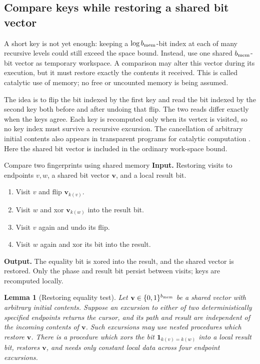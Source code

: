 \documentclass[11pt]{article}
\numberwithin{equation}{section}
\newtheorem{lemma}[theorem]{Lemma}
\theoremstyle{definition}
\theoremstyle{remark}
\begin{document}
\subsection{Compare keys while restoring a shared bit vector}

A short key is not yet enough: keeping a $\log {b_{\rm mem}}$-bit index at each of many recursive levels could still exceed the space bound. Instead, use one shared ${b_{\rm mem}}$-bit vector as temporary workspace. A comparison may alter this vector during its execution, but it must restore exactly the contents it received. This is called catalytic use of memory; no free or uncounted memory is being assumed.

The idea is to flip the bit indexed by the first key and read the bit indexed by the second key both before and after undoing that flip. The two reads differ exactly when the keys agree. Each key is recomputed only when its vertex is visited, so no key index must survive a recursive excursion.
The cancellation of arbitrary initial contents also appears in
transparent programs for catalytic computation
\cite[Section~3]{BuhrmanCleveKouckyLoffSpeelman2014}.  Here the shared bit
vector is included in the ordinary work-space bound.

\begin{algorithm}[label=alg:compare-fingerprints]{Compare two fingerprints using shared memory}
\textbf{Input.} Restoring visits to endpoints $v,w$, a shared bit vector ${\mathbf{v}}$, and a local result bit.
\begin{enumerate}[leftmargin=*]
\item Visit $v$ and flip ${\mathbf{v}}_{k(v)}$.
\item Visit $w$ and xor ${\mathbf{v}}_{k(w)}$ into the result bit.
\item Visit $v$ again and undo its flip.
\item Visit $w$ again and xor its bit into the result.
\end{enumerate}
\textbf{Output.} The equality bit is xored into the result, and the shared vector is restored. Only the phase and result bit persist between visits; keys are recomputed locally.
\end{algorithm}

\begin{lemma}[Restoring equality test]\label{lem:fp-catalytic}
Let ${\mathbf{v}}\in\{0,1\}^{b_{\rm mem}}$ be a shared vector with arbitrary initial contents.
Suppose an excursion to either of two deterministically specified
endpoints returns the cursor, and its path and result are independent
of the incoming contents of ${\mathbf{v}}$.  Such excursions may use nested
procedures which restore ${\mathbf{v}}$.  There is a procedure which xors the bit
$\mathbf1_{k(v)=k(w)}$ into a local result bit, restores ${\mathbf{v}}$, and needs
only constant local data across four endpoint excursions.
\end{lemma}
\end{document}
